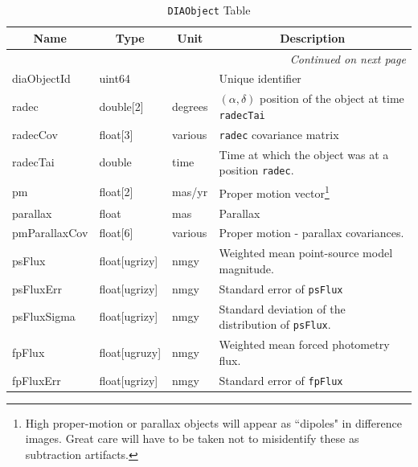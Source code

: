 \documentclass[12pt]{article}
\newcommand{\code}[1]{\texttt{#1}}
\newcommand{\DIAObject}{\code{DIAObject}\xspace}
\begin{document}
\begin{center}
\begin{longtable}{p{3cm}p{2cm}p{2cm}p{5cm}}
\caption[\DIAObject Table]{\DIAObject Table} \\

\hline \multicolumn{1}{c}{\bf Name} & \multicolumn{1}{c}{\bf Type} & \multicolumn{1}{c}{\bf Unit} & \multicolumn{1}{c}{\bf Description} \\ \hline
\endhead

\hline \multicolumn{4}{r}{{\em Continued on next page}} \\
\endfoot

\hline\hline
\endlastfoot

diaObjectId & uint64 & ~ & Unique identifier \\ 

radec & double[2] & degrees & $(\alpha, \delta)$ position of the object at time \texttt{radecTai} \\ 

radecCov & float[3] & various & \texttt{radec} covariance matrix \\ 

radecTai & double & time & Time at which the object was at a position \texttt{radec}. \\ 

pm & float[2] & mas/yr & Proper motion vector\footnote{High proper-motion or parallax objects will appear as ``dipoles" in difference images. Great care will have to be taken not to misidentify these as subtraction artifacts.} \\ 

parallax & float & mas & Parallax \\ 

pmParallaxCov & float[6] & various & Proper motion - parallax covariances. \\ 

psFlux & float[ugrizy] & nmgy & Weighted mean point-source model magnitude. \\ 

psFluxErr & float[ugrizy] & nmgy & Standard error of {\tt psFlux}  \\ 

psFluxSigma & float[ugrizy] & nmgy & Standard deviation of the distribution of {\tt psFlux}. \\ 

fpFlux & float[ugruzy] & nmgy & Weighted mean forced photometry flux.\\

fpFluxErr & float[ugrizy] & nmgy & Standard error of {\tt fpFlux} \\ 


\end{longtable}
\end{center}
\end{document}
